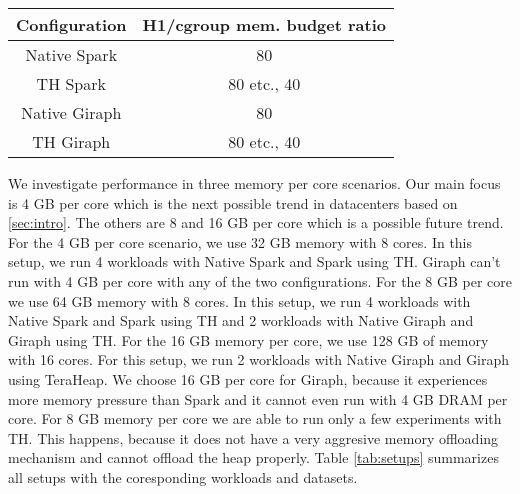 \begin{table}[thbp]
  \centering
	\caption{}
  \label{tab:budgets}
  \begin{tabular}{|c|c|}
    \hline
          \textbf{Configuration} & \textbf{H1/cgroup mem. budget ratio}\\
    \hline
          Native Spark & 80\\
          TH Spark & 80 etc., 40\\
          Native Giraph & 80\\
	  TH Giraph & 80 etc., 40\\
    \hline
  \end{tabular}
\end{table}


We investigate performance in three memory per core scenarios. Our main focus is 4 GB per core 
which is the next possible trend in datacenters based on \ref{sec:intro}. The others
are 8 and 16 GB per core which is a possible future trend. For the 4 GB per core scenario, we use 32 GB memory with 8 cores.
In this setup, we run 4 workloads with Native Spark and Spark using TH. Giraph can't run with 4 GB per core with any of the two
configurations.
For the 8 GB per core we use 64 GB memory with 8 cores. 
In this setup, we run 4 workloads with Native Spark and Spark using TH and 2 workloads with Native Giraph and Giraph using TH. For the 16 GB memory per core, we use 128 GB of memory with 16 cores. For this setup, we run 2 workloads with Native Giraph and Giraph using TeraHeap. We choose 16 GB per core for Giraph, because it experiences more memory pressure than Spark and it cannot even run with 4 GB DRAM per core. For 8 GB memory per core we are able to run only a few experiments with TH. This happens, because it does not have a very aggresive memory offloading mechanism and cannot offload the heap properly. Table \ref{tab:setups} summarizes all setups with the coresponding workloads and datasets.

